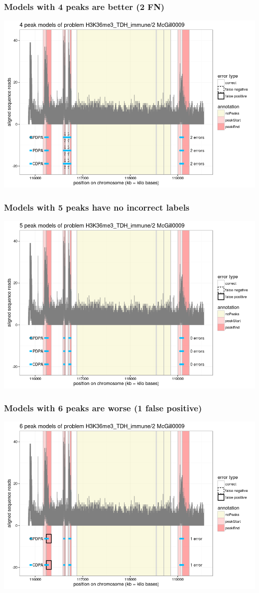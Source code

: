 \documentclass{beamer}
\begin{document}
\begin{frame}
  \frametitle{Models with 4 peaks are better (2 FN)}
  \includegraphics[width=\textwidth]{figure-min-train-error-problem5-4peaks}
\end{frame}

\begin{frame}
  \frametitle{Models with 5 peaks have no incorrect labels}
  \includegraphics[width=\textwidth]{figure-min-train-error-problem5-5peaks}
\end{frame}


\begin{frame}
  \frametitle{Models with 6 peaks are worse (1 false positive)}
  \includegraphics[width=\textwidth]{figure-min-train-error-problem5-6peaks}
\end{frame}
\end{document}

